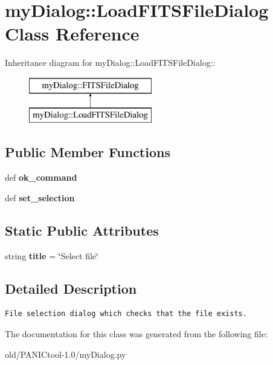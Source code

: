 \section{my\-Dialog::Load\-FITSFile\-Dialog Class Reference}
\label{classmyDialog_1_1LoadFITSFileDialog}
Inheritance diagram for my\-Dialog::Load\-FITSFile\-Dialog::\begin{figure}[H]
\begin{center}
\leavevmode
\includegraphics[height=2cm]{classmyDialog_1_1LoadFITSFileDialog}
\end{center}
\end{figure}
\subsection*{Public Member Functions}
\begin{CompactItemize}
\item 
def \textbf{ok\_\-command}\label{classmyDialog_1_1LoadFITSFileDialog_f56aa086e9e143266c0d4f1a080c4bae}

\item 
def \textbf{set\_\-selection}\label{classmyDialog_1_1LoadFITSFileDialog_9af3c30e2ad0e5ca3e4d35da2a8276a7}

\end{CompactItemize}
\subsection*{Static Public Attributes}
\begin{CompactItemize}
\item 
string \textbf{title} = \char`\"{}Select file\char`\"{}\label{classmyDialog_1_1LoadFITSFileDialog_ed814de16cb771269b0cbc1dc9723abe}

\end{CompactItemize}


\subsection{Detailed Description}


\footnotesize\begin{verbatim}File selection dialog which checks that the file exists.\end{verbatim}
\normalsize
 



The documentation for this class was generated from the following file:\begin{CompactItemize}
\item 
old/PANICtool-1.0/my\-Dialog.py\end{CompactItemize}
